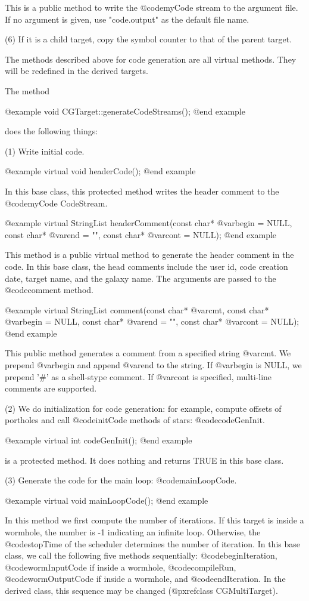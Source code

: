 This is a public method to write the @code{myCode} stream to the argument
file. If no argument is given, use "code.output" as the default file
name.

(6) If it is a child target, copy the symbol counter to that of
the parent target.

The methods described above for code generation are all virtual
methods.  They will be redefined in the derived targets.

The method 
   
@example
void CGTarget::generateCodeStreams();
@end example
   
does the following things:

(1) Write initial code.

@example
virtual void headerCode();
@end example

In this base class, this protected method writes the  header comment
to the @code{myCode} CodeStream.

@example
virtual StringList headerComment(const char* @var{begin} = NULL, const char*
@var{end} = "", const char* @var{cont} = NULL);
@end example

This method is a public virtual method to generate the header
comment in the code. In this base class, the head comments include the
user id, code creation date, target name, and the galaxy name. The
arguments are passed to the @code{comment} method.

@example
virtual StringList comment(const char* @var{cmt}, const char* @var{begin} = 
NULL, const char* @var{end} = "", const char* @var{cont} = NULL);
@end example

This public method generates a comment from a specified string @var{cmt}.
We prepend @var{begin} and append @var{end} to the string. If @var{begin}
is NULL, we prepend '#' as a shell-stype comment. If @var{cont} is 
specified, multi-line comments are supported.

(2) We do initialization for code generation: for example, compute
offsets of portholes and call @code{initCode} methods of stars:
@code{codeGenInit}.

@example
virtual int codeGenInit();
@end example

is a protected method. It does nothing and returns TRUE in this
base class.

(3) Generate the code for the main loop: @code{mainLoopCode}.

@example
virtual void mainLoopCode();
@end example

In this method we first compute the number of iterations. If this
target is inside a wormhole, the number is -1 indicating an infinite
loop. Otherwise, the @code{stopTime} of the scheduler determines the number
of iteration.  In this base class, we call the following five methods
sequentially: @code{beginIteration}, @code{wormInputCode} if inside a 
wormhole, @code{compileRun}, @code{wormOutputCode} if inside a wormhole, and
@code{endIteration}. In the derived class, this sequence may be changed
(@pxref{class CGMultiTarget}).


